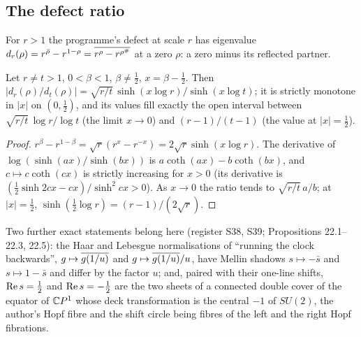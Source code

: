\subsection{The defect ratio}

For $r>1$ the programme's defect at scale $r$ has eigenvalue $d_r(\rho)=r^{\bar\rho}-r^{1-\rho}=\overline{r^\rho-r^{\rho^\#}}$ at a zero $\rho$: a zero minus its reflected partner.

\begin{lemma}\label{lem:defect}
Let $r\ne t>1$, $0<\beta<1$, $\beta\ne\tfrac12$, $x=\beta-\tfrac12$. Then $|d_r(\rho)/d_t(\rho)|=\sqrt{r/t}\,\sinh(x\log r)/\sinh(x\log t)$; it is strictly monotone in $|x|$ on $(0,\tfrac12)$, and its values fill exactly the open interval between $\sqrt{r/t}\,\log r/\log t$ (the limit $x\to0$) and $(r-1)/(t-1)$ (the value at $|x|=\tfrac12$).
\end{lemma}

\begin{proof}
$r^\beta-r^{1-\beta}=\sqrt r(r^x-r^{-x})=2\sqrt r\sinh(x\log r)$. The derivative of $\log(\sinh(ax)/\sinh(bx))$ is $a\coth(ax)-b\coth(bx)$, and $c\mapsto c\coth(cx)$ is strictly increasing for $x>0$ (its derivative is $(\tfrac12\sinh2cx-cx)/\sinh^2cx>0$). As $x\to0$ the ratio tends to $\sqrt{r/t}\,a/b$; at $|x|=\tfrac12$, $\sinh(\tfrac12\log r)=(r-1)/(2\sqrt r)$.
\end{proof}

Two further exact statements belong here (register S38, S39;  Propositions 22.1--22.3, 22.5): the Haar and Lebesgue normalisations of ``running the clock backwards'', $g\mapsto\overline{g(1/u)}$ and $g\mapsto\overline{g(1/u)}/u$, have Mellin shadows $s\mapsto-\bar s$ and $s\mapsto1-\bar s$ and differ by the factor $u$; and, paired with their one-line shifts, $\operatorname{Re} s=\tfrac12$ and $\operatorname{Re} s=-\tfrac12$ are the two sheets of a connected double cover of the equator of $\mathbb{C} P^1$ whose deck transformation is the central $-1$ of $SU(2)$, the author's Hopf fibre and the shift circle being fibres of the left and the right Hopf fibrations.
